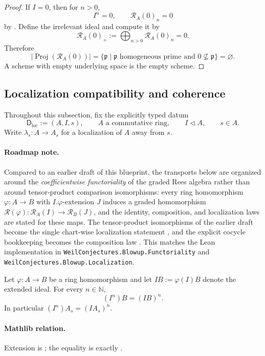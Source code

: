 \begin{proof}
  If $I=0$, then for $n>0$,
  \[
    I^n=0,
    \qquad \mathcal R_A(0)_n=0
  \]
  by .  Define the irrelevant ideal
  and compute it by
  \[
    \mathcal R_A(0)_+:=\bigoplus_{n>0}\mathcal R_A(0)_n=0.
  \]
  Therefore
  \[
    |\operatorname{Proj}(\mathcal R_A(0))|
      =\{\mathfrak p\mid \mathfrak p\text{ homogeneous prime and }
        0\nsubseteq\mathfrak p\}=\varnothing.
  \]
  A scheme with empty underlying space is the empty scheme.
\end{proof}

\subsection{Localization compatibility and coherence}

Throughout this subsection, fix the explicitly typed datum
\[
  \mathsf D_{\mathrm{loc}}:=(A,I,s),\qquad
  A\text{ a commutative ring},\qquad I\triangleleft A,\qquad s\in A.
                                                                    \tag{LOC0}
\]
Write $\lambda_s\colon A\to A_s$ for a localization of $A$ away from $s$.

\paragraph{Roadmap note.}  Compared to an earlier draft of this blueprint,
the transports below are organized around the \emph{coefficientwise
functoriality} of the graded Rees algebra rather than around
tensor-product comparison isomorphisms: every ring homomorphism
$\varphi\colon A\to B$ with $I.\varphi$-extension $J$ induces a graded
homomorphism $\mathcal R(\varphi)\colon\mathcal R_A(I)\to\mathcal R_B(J)$,
and the identity, composition, and localization laws are stated for these
maps.  The tensor-product isomorphisms of the earlier draft become the
single chart-wise localization statement
, and the explicit cocycle bookkeeping
becomes the composition law .
This matches the Lean implementation in
\texttt{WeilConjectures.Blowup.Functoriality} and
\texttt{WeilConjectures.Blowup.Localization}.

\begin{lemma}
  \label{lemma:nagata-localization-ideal-pow}
  \leanok

  Let $\varphi\colon A\to B$ be a ring homomorphism and let
  $I B:=\varphi(I)B$ denote the extended ideal.  For every $n\in\mathbb N$,
  \[
    (I^n)B=(IB)^n.
  \]
  In particular $(I^n)A_s=(IA_s)^n$.

  \paragraph{Mathlib relation.}
  Extension is \texttt{}; the equality is exactly
  \texttt{}.
\end{lemma}

